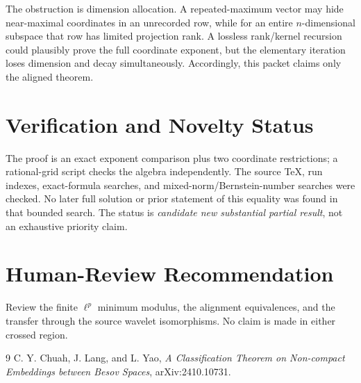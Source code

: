 \documentclass[11pt]{article}
\begin{document}
The obstruction is dimension allocation.  A repeated-maximum vector may
hide near-maximal coordinates in an unrecorded row, while for an entire
$n$-dimensional subspace that row has limited projection rank.  A lossless
rank/kernel recursion could plausibly prove the full coordinate exponent,
but the elementary iteration loses dimension and decay simultaneously.
Accordingly, this packet claims only the aligned theorem.

\section*{Verification and Novelty Status}

The proof is an exact exponent comparison plus two coordinate restrictions;
a rational-grid script checks the algebra independently.  The source TeX,
run indexes, exact-formula searches, and mixed-norm/Bernstein-number searches
were checked.  No later full solution or prior statement of this equality
was found in that bounded search.  The status is \emph{candidate new
substantial partial result}, not an exhaustive priority claim.

\section*{Human-Review Recommendation}

Review the finite $\ell^p$ minimum modulus, the alignment equivalences, and
the transfer through the source wavelet isomorphisms.  No claim is made in
either crossed region.

\begin{thebibliography}{9}
C. Y. Chuah, J. Lang, and L. Yao,
\emph{A Classification Theorem on Non-compact Embeddings between Besov
Spaces}, arXiv:2410.10731.
\end{thebibliography}
\end{document}
